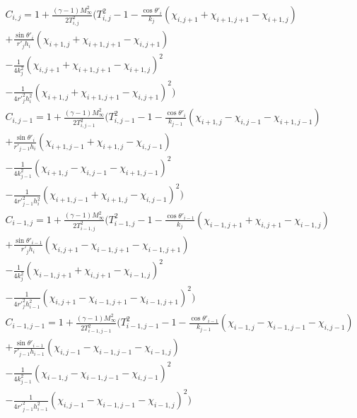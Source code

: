 \documentclass[a4paper]{report}
\begin{document}
	\begin{equation}
		\begin{split}
		C_{i,j} = 1 + \frac{(\gamma-1)M_\infty^2}{2T_{i,j}^2}
		\Biggl(
			T_{i,j}^2 - 1
			- \frac{\cos \theta '_i}{k_j}( \chi_{i,j+1} + \chi_{i+1,j+1} - \chi_{i+1,j} ) \\
			+ \frac{\sin \theta '_i}{r'_j h_i}( \chi_{i+1,j} + \chi_{i+1,j+1} - \chi_{i,j+1} ) \\
			- \frac{1}{4k_j^2}( \chi_{i,j+1} + \chi_{i+1,j+1} - \chi_{i+1,j} )^2 \\
			- \frac{1}{4r'^2_j h_i^2}( \chi_{i+1,j} + \chi_{i+1,j+1} - \chi_{i,j+1} )^2
		\Biggr) \\
		C_{i,j-1} = 1 + \frac{(\gamma-1)M_\infty^2}{2T_{i,j-1}^2}
		\Biggl(
			T_{i,j-1}^2 - 1
			- \frac{\cos \theta '_i}{k_{j-1}}( \chi_{i+1,j} - \chi_{i,j-1} - \chi_{i+1,j-1} ) \\
			+ \frac{\sin \theta '_i}{r'_{j-1} h_i}( \chi_{i+1,j-1} + \chi_{i+1,j} - \chi_{i,j-1} ) \\
			- \frac{1}{4k_{j-1}^2}( \chi_{i+1,j} - \chi_{i,j-1} - \chi_{i+1,j-1} )^2 \\
			- \frac{1}{4r'^2_{j-1} h_i^2}( \chi_{i+1,j-1} + \chi_{i+1,j} - \chi_{i,j-1} )^2
		\Biggr) \\
		C_{i-1,j} = 1 + \frac{(\gamma-1)M_\infty^2}{2T_{i-1,j}^2}
		\Biggl(
			T_{i-1,j}^2 - 1
			- \frac{\cos \theta '_{i-1}}{k_j}( \chi_{i-1,j+1} + \chi_{i,j+1} - \chi_{i-1,j} ) \\
			+ \frac{\sin \theta '_{i-1}}{r'_j h_i}( \chi_{i,j+1} - \chi_{i-1,j+1} - \chi_{i-1,j+1} ) \\
			- \frac{1}{4k_j^2}( \chi_{i-1,j+1} + \chi_{i,j+1} - \chi_{i-1,j} )^2 \\
			- \frac{1}{4r'^2_j h_{i-1}^2}( \chi_{i,j+1} - \chi_{i-1,j+1} - \chi_{i-1,j+1} )^2
		\Biggr) \\
		C_{i-1,j-1} = 1 + \frac{(\gamma-1)M_\infty^2}{2T_{i-1,j-1}^2}
		\Biggl(
			T_{i-1,j-1}^2 - 1
			- \frac{\cos \theta '_{i-1}}{k_{j-1}}( \chi_{i-1,j} - \chi_{i-1,j-1} - \chi_{i,j-1} ) \\
			+ \frac{\sin \theta '_{i-1}}{r'_{j-1} h_{i-1}}( \chi_{i,j-1} - \chi_{i-1,j-1} - \chi_{i-1,j} ) \\
			- \frac{1}{4k_{j-1}^2}( \chi_{i-1,j} - \chi_{i-1,j-1} - \chi_{i,j-1} )^2 \\
			- \frac{1}{4r'^2_{j-1} h_{i-1}^2}( \chi_{i,j-1} - \chi_{i-1,j-1} - \chi_{i-1,j} )^2
		\Biggr) \\
		\end{split}
	\end{equation}
	
\end{document}

